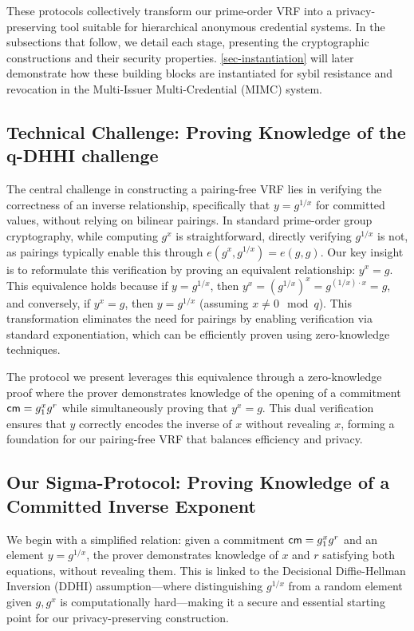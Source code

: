 These protocols collectively transform our prime-order VRF into a privacy-preserving tool suitable for hierarchical anonymous credential systems. In the subsections that follow, we detail each stage, presenting the cryptographic constructions and their security properties. \ref{sec-instantiation} will later demonstrate how these building blocks are instantiated for sybil resistance and revocation in the Multi-Issuer Multi-Credential (MIMC) system.







\subsection{Technical Challenge: Proving Knowledge of the q-DHHI challenge}

The central challenge in constructing a pairing-free VRF lies in verifying the correctness of an inverse relationship, specifically that $y = g^{1/x}$ for committed values, without relying on bilinear pairings. In standard prime-order group cryptography, while computing $g^x$ is straightforward, directly verifying $g^{1/x}$ is not, as pairings typically enable this through $e(g^x, g^{1/x}) = e(g,g)$. Our key insight is to reformulate this verification by proving an equivalent relationship: $y^x = g$. This equivalence holds because if $y = g^{1/x}$, then $y^x = (g^{1/x})^x = g^{(1/x) \cdot x} = g$, and conversely, if $y^x = g$, then $y = g^{1/x}$ (assuming $x \neq 0 \mod q$). This transformation eliminates the need for pairings by enabling verification via standard exponentiation, which can be efficiently proven using zero-knowledge techniques.

The protocol we present leverages this equivalence through a zero-knowledge proof where the prover demonstrates knowledge of the opening of a commitment $\mathsf{cm} = g_1^x g^r$ while simultaneously proving that $y^x = g$. This dual verification ensures that $y$ correctly encodes the inverse of $x$ without revealing $x$, forming a foundation for our pairing-free VRF that balances efficiency and privacy.

\subsection{Our Sigma-Protocol: Proving Knowledge of a Committed Inverse Exponent}

We begin with a simplified relation: given a commitment $\mathsf{cm} = g_1^x g^r$ and an element $y = g^{1/x}$, the prover demonstrates knowledge of $x$ and $r$ satisfying both equations, without revealing them. This is linked to the Decisional Diffie-Hellman Inversion (DDHI) assumption—where distinguishing $g^{1/x}$ from a random element given $g, g^x$ is computationally hard—making it a secure and essential starting point for our privacy-preserving construction.


